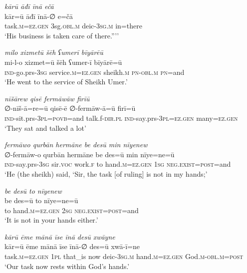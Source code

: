 \ea \label{ŠJ.79}
\textit{kārū āđī īnā ečā} \\ 
\gll kār=ū āđī īnā-∅ e=čā \\ 
 task\textsc{.m}\textsc{=ez.gen} 3sg\textsc{.obl}\textsc{.m} deic\textsc{-3sg}\textsc{.m} in=there \\ 
\glt `His business is taken care of there.”’'
\z 
 
\ea \label{ŠJ.83}
\textit{milo xizmetū šēh ʕumerī bīyārēū} \\ 
\gll mi-l-o xizmet=ū šēh ʕumer-ī bīyārē=ū \\ 
 \textsc{ind-}go.prs\textsc{-3sg} service\textsc{.m}\textsc{=ez.gen} sheikh\textsc{.m} \textsc{pn}\textsc{-obl}\textsc{.m} \textsc{pn}=and \\ 
\glt `He went to the service of Sheikh Umer.'
\z 
 
\ea \label{ŠJ.85}
\textit{nīšārew qisē fermāwāw firīū} \\ 
\gll ∅-nīš-ā=re=ū qisē-ē ∅-fermāw-ā=ū firī=ū \\ 
 \textsc{ind-}sit.prs\textsc{-3pl}\textsc{=\textsc{povb}}=and talk.f\textsc{-dir}\textsc{.pl} \textsc{ind-}say.prs\textsc{-3pl}\textsc{=ez.gen} many\textsc{=ez.gen} \\ 
\glt `They sat and talked a lot'
\z 
 
\ea \label{ŠJ.86}
\textit{fermāwo qurbān hermāne be desū min nīyenew} \\ 
\gll ∅-fermāw-o qurbān hermāne be des=ū min nīye=ne=ū \\ 
 \textsc{ind-}say.prs\textsc{-3sg} sir.\textsc{voc} work\textsc{.f} to hand\textsc{.m}\textsc{=ez.gen} \textsc{1sg} \textsc{\textsc{neg.}exist}\textsc{=\textsc{post}}=and \\ 
\glt `He (the sheikh) said, ‘Sir, the task [of ruling] is not in my hands;'
\z 
 
\ea \label{ŠJ.87}
\textit{be desū to nīyenew} \\ 
\gll be des=ū to nīye=ne=ū \\ 
 to hand\textsc{.m}\textsc{=ez.gen} \textsc{2sg} \textsc{\textsc{neg.}exist}\textsc{=\textsc{post}}=and \\ 
\glt `It is not in your hands either.'
\z 
 
\ea \label{ŠJ.88}
\textit{kārū ēme mānā īse īnā desū xwāyne} \\ 
\gll kār=ū ēme mānā īse īnā-∅ des=ū xwā-ī=ne \\ 
 task\textsc{.m}\textsc{=ez.gen} \textsc{1pl} that\_is now deic\textsc{-3sg}\textsc{.m} hand\textsc{.m}\textsc{=ez.gen} God\textsc{.m}\textsc{-obl}\textsc{.m}\textsc{=\textsc{post}} \\ 
\glt `Our task now rests within God’s hands.'
\z 
 
